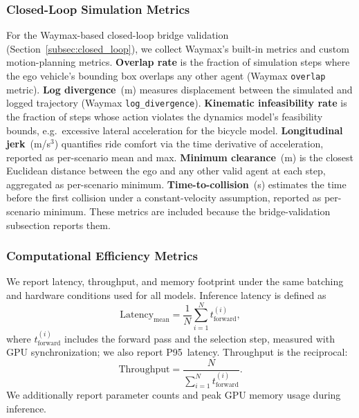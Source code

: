 \subsubsection{Closed-Loop Simulation Metrics}
\label{subsubsec:closed_loop_metrics}

For the Waymax-based closed-loop bridge validation (Section~\ref{subsec:closed_loop}), we collect Waymax's built-in metrics and custom motion-planning metrics. \textbf{Overlap rate} is the fraction of simulation steps where the ego vehicle's bounding box overlaps any other agent (Waymax \texttt{overlap} metric). \textbf{Log divergence}~(m) measures displacement between the simulated and logged trajectory (Waymax \texttt{log\_divergence}). \textbf{Kinematic infeasibility rate} is the fraction of steps whose action violates the dynamics model's feasibility bounds, e.g.\ excessive lateral acceleration for the bicycle model. \textbf{Longitudinal jerk}~(m/s$^3$) quantifies ride comfort via the time derivative of acceleration, reported as per-scenario mean and max. \textbf{Minimum clearance}~(m) is the closest Euclidean distance between the ego and any other valid agent at each step, aggregated as per-scenario minimum. \textbf{Time-to-collision}~(s) estimates the time before the first collision under a constant-velocity assumption, reported as per-scenario minimum.  These metrics are included because the bridge-validation subsection reports them.

\subsubsection{Computational Efficiency Metrics}

We report latency, throughput, and memory footprint under the same batching and hardware conditions used for all models.  Inference latency is defined as
\begin{equation}
\text{Latency}_{\text{mean}} = \frac{1}{N} \sum_{i=1}^{N} t_{\text{forward}}^{(i)},
\end{equation}
where $t_{\text{forward}}^{(i)}$ includes the forward pass and the selection step, measured with GPU synchronization; we also report P95~latency. Throughput is the reciprocal:
\begin{equation}
\text{Throughput} = \frac{N}{\sum_{i=1}^{N} t_{\text{forward}}^{(i)}}.
\end{equation}
We additionally report parameter counts and peak GPU memory usage during inference.

